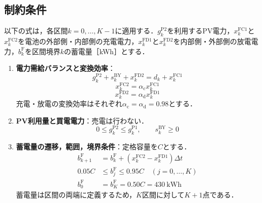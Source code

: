 \documentclass[a4paper,11pt,xelatex,ja=standard]{bxjsarticle}
\begin{document}
\subsection{制約条件}
以下の式は，各区間$k=0,\ldots,K-1$に適用する．$g^{\mathrm{P2}}_k$を利用するPV電力，$x^{\mathrm{FC1}}_k$と$x^{\mathrm{FC2}}_k$を電池の外部側・内部側の充電電力，$x^{\mathrm{FD1}}_k$と$x^{\mathrm{FD2}}_k$を内部側・外部側の放電電力，$b^{\mathrm{F}}_k$を区間境界$k$の蓄電量［kWh］とする．

\begin{enumerate}
    \item \textbf{電力需給バランスと変換効率}：
          \begin{equation}
              g^{\mathrm{P2}}_k+s^{\mathrm{BY}}_k+x^{\mathrm{FD2}}_k
              =d_k+x^{\mathrm{FC1}}_k \label{eq:balance}
          \end{equation}
          \begin{equation}
              x^{\mathrm{FC2}}_k=\alpha_{\mathrm c}x^{\mathrm{FC1}}_k
              \label{eq:charge-efficiency}
          \end{equation}
          \begin{equation}
              x^{\mathrm{FD2}}_k=\alpha_{\mathrm d}x^{\mathrm{FD1}}_k
              \label{eq:discharge-efficiency}
          \end{equation}
          充電・放電の変換効率はそれぞれ$\alpha_{\mathrm c}=\alpha_{\mathrm d}=0.98$とする．

    \item \textbf{PV利用量と買電電力}：売電は行わない．
          \begin{equation}
              0\leq g^{\mathrm{P2}}_k\leq g^{\mathrm{P1}}_k,\qquad
              s^{\mathrm{BY}}_k\geq0 \label{eq:pv-buy}
          \end{equation}

    \item \textbf{蓄電量の遷移，範囲，境界条件}：定格容量を$C$とする．
          \begin{align}
              b^{\mathrm{F}}_{k+1}
                               & =b^{\mathrm{F}}_k+
              (x^{\mathrm{FC2}}_k-x^{\mathrm{FD1}}_k)\Delta t
              \label{eq:soc-update}                    \\
              0.05C            & \leq b^{\mathrm{F}}_j
              \leq0.95C
              \quad(j=0,\ldots,K) \label{eq:soc-range} \\
              b^{\mathrm{F}}_0 & =b^{\mathrm{F}}_K
              =0.50C=430\ \mathrm{kWh} \label{eq:soc-boundary}
          \end{align}
          蓄電量は区間の両端に定義するため，$K$区間に対して$K+1$点である．


\end{enumerate}
\end{document}
